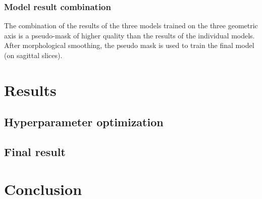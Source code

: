 \begin{multicols}{2}
\subsubsection*{Model result combination}
\par{
    The combination of the results of the three models trained on the three geometric axis is a pseudo-mask of higher quality than the results of the individual models.
    After morphological smoothing, the pseudo mask is used to train the final model (on sagittal slices).
}

\thispagestyle{plain}
\section*{Results}
\subsection*{Hyperparameter optimization}


\subsection*{Final result}

\section*{Conclusion}
\cleardoublepage
\end{multicols}